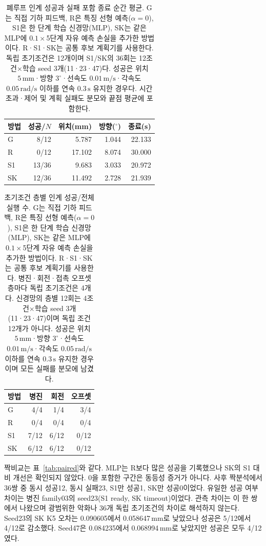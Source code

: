 \documentclass[conference,a4paper]{IEEEtran}
\begin{document}
\begin{table}[t]
\caption{폐루프 인계 성공과 실패 포함 종료 순간 평균.
G는 직접 기하 피드백, R은 특징 선형 예측($\alpha=0$), S1은 한 단계 학습 신경망(MLP), SK는 같은 MLP에 $0.1\times$5단계 자유 예측 손실을 추가한 방법이다.
R·S1·SK는 공통 후보 계획기를 사용한다.
독립 초기조건은 12개이며 S1/SK의 36회는 12조건$\times$학습 seed 3개(11·23·47)다.
성공은 위치 $5\,\mathrm{mm}$·방향 $3^\circ$·선속도 $0.01\,\mathrm{m/s}$·각속도 $0.05\,\mathrm{rad/s}$ 이하를 연속 $0.3\,\mathrm s$ 유지한 경우다.
시간 초과·제어 및 계획 실패도 분모와 끝점 평균에 포함한다.}\label{tab:handoff}
\centering\small
\begin{tabular}{@{}lrrrr@{}}
\toprule 방법 & 성공/$N$ & 위치(mm) & 방향($^\circ$) & 종료(s)\\ \midrule
G & 8/12 & 5.787 & 1.044 & 22.133\\
R & 0/12 & 17.102 & 8.074 & 30.000\\
S1 & 13/36 & 9.683 & 3.033 & 20.972\\
SK & 12/36 & 11.492 & 2.728 & 21.939\\
\bottomrule
\end{tabular}
\end{table}

\begin{table}[t]
\caption{초기조건 층별 인계 성공/전체 실행 수.
G는 직접 기하 피드백, R은 특징 선형 예측($\alpha=0$), S1은 한 단계 학습 신경망(MLP), SK는 같은 MLP에 $0.1\times$5단계 자유 예측 손실을 추가한 방법이다.
R·S1·SK는 공통 후보 계획기를 사용한다.
병진·회전·접촉 오프셋 층마다 독립 초기조건은 4개다.
신경망의 층별 12회는 4조건$\times$학습 seed 3개(11·23·47)이며 독립 조건 12개가 아니다.
성공은 위치 $5\,\mathrm{mm}$·방향 $3^\circ$·선속도 $0.01\,\mathrm{m/s}$·각속도 $0.05\,\mathrm{rad/s}$ 이하를 연속 $0.3\,\mathrm s$ 유지한 경우이며 모든 실패를 분모에 남겼다.}\label{tab:strata}
\centering\small
\begin{tabular}{@{}lrrr@{}}
\toprule 방법 & 병진 & 회전 & 오프셋\\ \midrule
G & 4/4 & 1/4 & 3/4\\
R & 0/4 & 0/4 & 0/4\\
S1 & 7/12 & 6/12 & 0/12\\
SK & 6/12 & 6/12 & 0/12\\
\bottomrule
\end{tabular}
\end{table}

짝비교는 표~\ref{tab:paired}와 같다.
MLP는 R보다 많은 성공을 기록했으나 SK의 S1 대비 개선은 확인되지 않았다.
0을 포함한 구간은 동등성 증거가 아니다.
사후 짝분석에서 36쌍 중 동시 성공12, 동시 실패23, S1만 성공1, SK만 성공0이었다.
유일한 성공 여부 차이는 병진 family03의 seed23(S1 ready, SK timeout)이었다.
관측 차이는 이 한 쌍에서 나왔으며 광범위한 악화나 36개 독립 초기조건의 차이로 해석하지 않는다.
Seed23의 SK K5 오차는 0.090605에서 0.058647\,mm로 낮았으나 성공은 5/12에서 4/12로 감소했다.
Seed47은 0.084235에서 0.068994\,mm로 낮았지만 성공은 모두 4/12였다.
\end{document}
